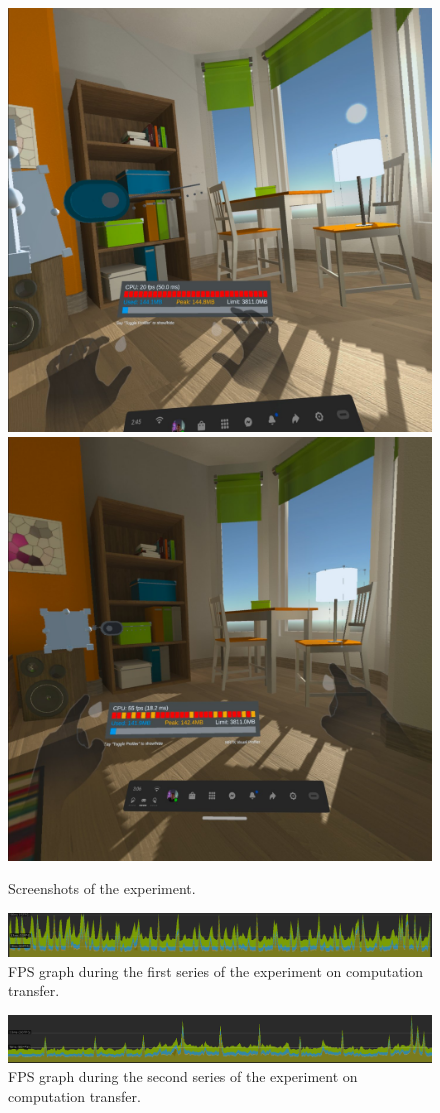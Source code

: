 \begin{figure}
  \centering
    {\includegraphics[width=0.45\linewidth]{figures/Series1FPSOculus.jpg}}
    {\includegraphics[width=0.45\linewidth]{figures/Series2FPSOculus.jpg}}
  \caption{Screenshots of the experiment.}
  \label{fig:exp-screenshot}
\end{figure}

\begin{figure}
  \centering
  \includegraphics[width = 0.9 \linewidth]{figures/Series2FPSpng.png}
  \caption{FPS graph during the first series of the experiment on computation transfer.}
  \label{fig:Series2FPSpng-figure}
\end{figure}

\begin{figure}
  \centering
  \includegraphics[width = 0.9 \linewidth]{figures/Series1FPS.png}
  \caption{FPS graph during the second series of the experiment on computation transfer.}
  \label{fig:Series1FPSpng-figure}
\end{figure}

